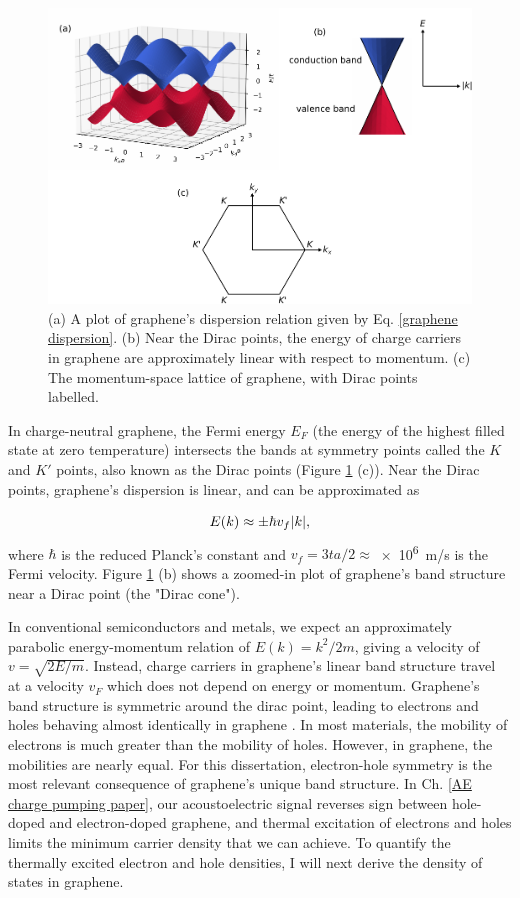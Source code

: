 \documentclass[double,12pt,1in]{beavtex}
\begin{document}
\begin{figure}
    \includegraphics{Graphene band structure 3D.pdf}
    \caption{(a) A plot of graphene's dispersion relation given by Eq. \ref{graphene dispersion}. (b) Near the Dirac points, the energy of charge carriers in graphene are approximately linear with respect to momentum. (c) The momentum-space lattice of graphene, with Dirac points labelled.}
    \label{graphene dispersion plot}
\end{figure}
In charge-neutral graphene, the Fermi energy $E_F$ (the energy of the highest filled state at zero temperature) intersects the bands at symmetry points called the $K$ and $K'$ points, also known as the Dirac points (Figure \ref{graphene dispersion plot} (c)). Near the Dirac points, graphene's dispersion is linear, and can be approximated as

\begin{equation}
    E(k) \approx \pm \hbar v_f \abs{k}, \label{linear dispersion of graphene}
\end{equation}
where $\hbar$ is the reduced Planck's constant and $v_f = 3ta/2  \approx $\SI{e6}{\meter/\second} is the Fermi velocity. Figure \ref{graphene dispersion plot} (b) shows a zoomed-in plot of graphene's band structure near a Dirac point (the "Dirac cone").

In conventional semiconductors and metals, we expect an approximately parabolic energy-momentum relation of $E(k) = k^2/2m$, giving a velocity of $v = \sqrt{2E/m}$. Instead, charge carriers in graphene's linear band structure travel at a velocity $v_F$ which does not depend on energy or momentum. Graphene's band structure is symmetric around the dirac point, leading to electrons and holes behaving almost identically in graphene \cite{castro_neto_electronic_2009}. In most materials, the mobility of electrons is much greater than the mobility of holes. However, in graphene, the mobilities are nearly equal. For this dissertation, electron-hole symmetry is the most relevant consequence of graphene's unique band structure. In Ch. \ref{AE charge pumping paper}, our acoustoelectric signal reverses sign between hole-doped and electron-doped graphene, and thermal excitation of electrons and holes limits the minimum carrier density that we can achieve. To quantify the thermally excited electron and hole densities, I will next derive the density of states in graphene.
\end{document}
